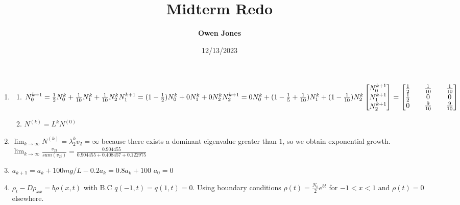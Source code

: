 \documentclass[10pt]{article}
\title{\bf Midterm Redo}
\date{12/13/2023}
\author{\bf Owen Jones}
\begin{document}
\maketitle
\begin{enumerate}[label= (Q-\arabic*)]
    \item \begin{enumerate}
        \item $N_0^{k+1}=\frac{1}{2}N_0^k+\frac{1}{10}N_1^k+\frac{1}{10}N_2^k\\
        N_1^{k+1}=(1-\frac{1}{2})N_0^k+0N_1^k+0N_2^k\\
        N_2^{k+1}=0N_0^k+(1-\frac{1}{5}+\frac{1}{10})N_1^k+(1-\frac{1}{10})N_2^k\\
        \begin{bmatrix}
            N_0^{k+1}\\
            N_1^{k+1}\\
            N_2^{k+1}
        \end{bmatrix}=\begin{bmatrix}
            \frac{1}{2} && \frac{1}{10} && \frac{1}{10}\\
            \frac{1}{2} && 0 && 0\\
            0 && \frac{9}{10} && \frac{9}{10}
        \end{bmatrix}$
        \item $N^{(k)}=L^k N^{(0)}$
            \end{enumerate}
    \item $\lim_{k\rightarrow\infty}N^{(k)}=\lambda_2^k v_2=\infty$ because there exists a dominant eigenvalue greater than $1$, so we obtain exponential growth.\\
    $\lim_{k\rightarrow\infty}\frac{v_{21}}{sum(v_{2i})}=\frac{0.904455}{0.904455+0.408457+0.122975}$
    \item $a_{k+1}=a_k+100mg/L-0.2a_k=0.8a_k+100$ $a_0=0$
    \item $\rho_t-D\rho_{xx}=b\rho(x,t)$ with B.C $q(-1,t)=q(1,t)=0$. Using boundary conditions $\rho(t)=\frac{N_0}{2}e^{bt}$ for $-1<x<1$ and $\rho(t)=0$ elsewhere.
\end{enumerate}
\end{document}
